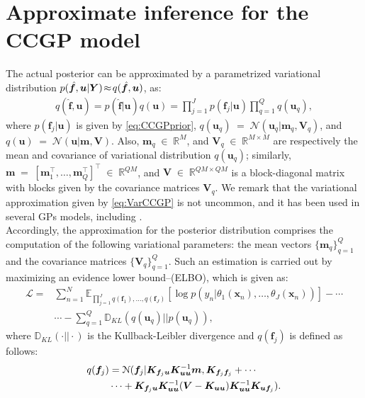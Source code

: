 \documentclass[journal]{IEEEtran}
\providecommand{\ve}[1]{{\bm{#1}}}%
\providecommand{\mat}[1]{{\bm{#1}}} %
\newcommand{\Real}{\mathbb{R}}
\DeclareMathOperator{\en}{\!\,\in\!\,}
\DeclareMathOperator{\igual}{\!\,=\!\,}
\providecommand{\s}[1]{\negthinspace#1\negthinspace}%
\providecommand{\ve}[1]{{\mathbf{#1}}}
\providecommand{\mat}[1]{{\mathbf{#1}}}
\newcommand{\gauss}{\mathcal{N}} %
\begin{document}
\section{Approximate inference for the CCGP model}\label{ApInCCGP}
The actual posterior can be approximated by a parametrized variational distribution $p(\hat{\ve{f}},{\ve{u}}|\mat{Y})\s{\approx} q(\hat{\ve{f}},{\ve{u}})$, as:
\begin{align}
\label{eq:VarCCGP}
q(\hat{\ve{f}}, {\ve{u}}) = p(\hat{\ve{f}}|{\ve{u}})q({\ve{u}})= \prod_{j=1}^{J}p(\ve{f}_j|{\ve{u}})\prod_{q=1}^{Q}q(\ve{u}_q),
\end{align}
where $p(\ve{f}_j|{\ve{u}})$ is given by \cref{eq:CCGPprior}, $q(\ve{u}_q)\igual\gauss(\ve{u}_q|\ve{m}_q,\mat{V}_q)$, and $q({\ve{u}})\igual \gauss({\ve{u}}|\ve{m},\mat{V})$. Also, $\ve{m}_q\en\Real^{M}$, and $\mat{V}_q\en \Real^{M\times M}$ are respectively the mean and covariance of variational distribution $q(\ve{u}_q)$; similarly, $\ve{m} \igual [\ve{m}_1^{\top}, \dots , \ve{m}_Q^{\top}]^{\top}\en \Real^{QM}$, and $\mat{V}\en \Real^{QM\times QM}$ is a block-diagonal matrix with blocks given by the covariance matrices $\mat{V}_q$. We remark that the variational approximation given by \cref{eq:VarCCGP} is not uncommon, and it has been used in several GPs models, including \cite{saul2016chained,moreno2018heterogeneous}.\\
Accordingly, the approximation for the posterior distribution comprises the computation of the following variational parameters: the mean vectors $\{\ve{m}_q\}_{q=1}^{Q}$ and the covariance matrices $\{\mat{V}_q\}_{q=1}^{Q}$. Such an estimation is carried out by maximizing an evidence lower bound--(ELBO), which is given as:
\begin{align}
\mathcal{L}
=&\sum_{n=1}^{N}\mathbb{E}_{\prod\limits^J_{j=1}q(\ve{f}_1),\dots , q(\ve{f}_J)}\left[\log p(y_n|\theta_1(\ve{x}_n),\dots , \theta_J(\ve{x}_n))\right]-\cdots\nonumber\\
&\cdots-\sum_{q=1}^{Q} \mathbb{D}_{KL}(q(\ve{u}_q)||p(\ve{u}_q))\label{eq:LowBound21},
\end{align}
where $\mathbb{D}_{KL}(\cdot||\cdot)$ is the Kullback-Leibler divergence and $q(\ve{f}_j)$ is defined as follows:
\begin{align}
\notag q(\ve{f}_j) &=\gauss(\ve{f}_j|\mat{K}_{\ve{f}_j\ve{u}}\mat{K}_{\ve{u}\ve{u}}^{-1}\ve{m}, \mat{K}_{\ve{f}_j\ve{f}_j}+\cdots\\
& \cdots + \mat{K}_{\ve{f}_j\ve{u}}\mat{K}_{\ve{u}\ve{u}}^{-1}(\mat{V}-\mat{K}_{\ve{u}\ve{u}})\mat{K}_{\ve{u}\ve{u}}^{-1}\mat{K}_{\ve{u}\ve{f}_j}).
\end{align}
\end{document}
